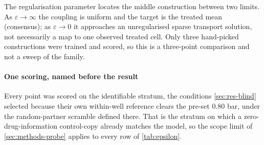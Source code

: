 The regularisation parameter locates the middle construction between two limits.
As $\varepsilon\rightarrow\infty$ the coupling is uniform and the target is the
treated mean (consensus); as $\varepsilon\rightarrow 0$ it approaches an
unregularised sparse transport solution, not necessarily a map to one observed
treated cell. Only three hand-picked constructions were trained and scored, so
this is a three-point comparison and not a sweep of the family.

\paragraph{One scoring, named before the result} Every point was scored on the
identifiable stratum, the conditions \cref{sec:res-blind} selected because their
own within-well reference clears the pre-set $0.80$ bar, under the random-partner
scramble defined there. That is the stratum on which a zero-drug-information
control-copy already matches the model, so the scope limit of
\cref{sec:methods-probe} applies to every row of \cref{tab:epsilon}.

